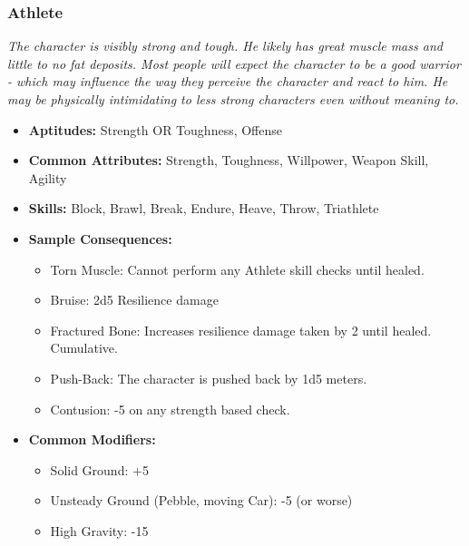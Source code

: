 \subsubsection{Athlete}\label{Athlete}
\textit{The character is visibly strong and tough.
He likely has great muscle mass and little to no fat deposits.
Most people will expect the character to be a good warrior - which may influence the way they perceive the character and react to him.
He may be physically intimidating to less strong characters even without meaning to.}
\begin{itemize}
	\item \textbf{Aptitudes:} Strength OR Toughness, Offense
	\item \textbf{Common Attributes:} Strength, Toughness, Willpower, Weapon Skill, Agility
	\item \textbf{Skills:} Block, Brawl, Break, Endure, Heave, Throw, Triathlete
	\item \textbf{Sample Consequences:} 
	\begin{itemize}
		\item Torn Muscle: Cannot perform any Athlete skill checks until healed.
		\item Bruise: 2d5 Resilience damage
		\item Fractured Bone: Increases resilience damage taken by 2 until healed. Cumulative.
		\item Push-Back: The character is pushed back by 1d5 meters.
		\item Contusion: -5 on any strength based check.
	\end{itemize}
	\item \textbf{Common Modifiers:}
	\begin{itemize}
		\item Solid Ground: +5
		\item Unsteady Ground (Pebble, moving Car): -5 (or worse)
		\item High Gravity: -15
	\end{itemize}
\end{itemize}


